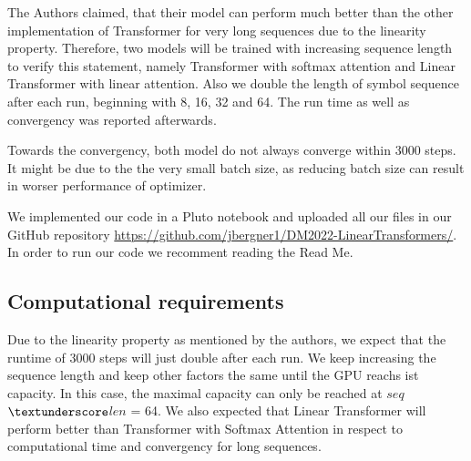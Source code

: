 \documentclass[DIV=13,fontsize=11pt]{scrartcl}
\begin{document}
The Authors claimed, that their model can perform much better than the other implementation of Transformer for very long sequences due to the linearity property. Therefore, two models will be trained with increasing sequence length to verify this statement, namely Transformer with softmax attention and Linear Transformer with linear attention. Also we double the length of symbol sequence after each run, beginning with 8, 16, 32 and 64. The run time as well as convergency was reported afterwards.

Towards the convergency, both model do not always converge within 3000 steps. It might be due to the the very small batch size, as reducing batch size can result in worser performance of optimizer. 

We implemented our code in a Pluto notebook and uploaded all our files in our GitHub repository \url{https://github.com/jbergner1/DM2022-LinearTransformers/}. In order to run our code we recomment reading the Read Me. 



\subsection{Computational requirements}
Due to the linearity property as mentioned by the authors, we expect that the runtime of 3000 steps will just double after each run. We keep increasing the sequence length and keep other factors the same until the GPU reachs ist capacity. In this case, the maximal capacity can only be reached at \(seq\)\(\textunderscore\)\(len\) = 64. We also expected that Linear Transformer will perform better than Transformer with Softmax Attention in respect to computational time and convergency for long sequences.

\end{document}
